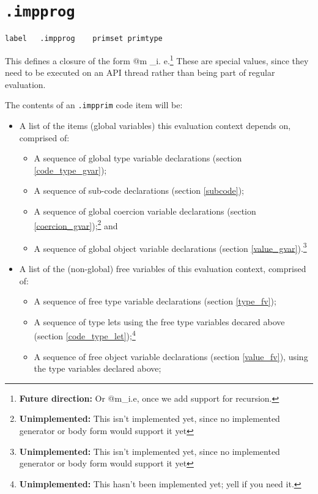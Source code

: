 \documentclass{report}
\newcommand\stringcode[1]{\texttt{#1}}
\newcommand\unimpl[1]{\footnote{\textbf{Unimplemented: }#1}}
\newcommand\future[1]{\footnote{\textbf{Future direction:} #1}}
\begin{document}
\section{\stringcode{.impprog}}

\begin{verbatim}
label	.impprog	primset	primtype
\end{verbatim}

This defines a closure of the form \< @m _i. e\>.\future{Or \<\;\;@m\;\overline{g_i}_i.\;e\>, once we add support for recursion.}
These are special values, since they need to be executed on an API thread rather than being part of regular evaluation.

The contents of an \stringcode{.impprim} code item will be:
\begin{itemize}
    \item A list of the items (global variables) this evaluation context depends on, comprised of:
        \begin{itemize}
            \item A sequence of global type variable declarations (section \ref{code_type_gvar});
            \item A sequence of sub-code declarations (section \ref{subcode});
            \item A sequence of global coercion variable declarations (section \ref{coercion_gvar});\unimpl{This isn't implemented yet, since no implemented generator or body form would support it yet} and
            \item A sequence of global object variable declarations (section \ref{value_gvar}).\unimpl{This isn't implemented yet, since no implemented generator or body form would support it yet}
        \end{itemize}
    \item A list of the (non-global) free variables of this evaluation context, comprised of:
        \begin{itemize}
            \item A sequence of free type variable declarations (section \ref{type_fv});
            \item A sequence of type lets using the free type variables decared above (section \ref{code_type_let});\unimpl{This hasn't been implemented yet; yell if you need it.}
            \item A sequence of free object variable declarations (section \ref{value_fv}), using the type variables declared above;
        \end{itemize}

\end{itemize}
\end{document}
